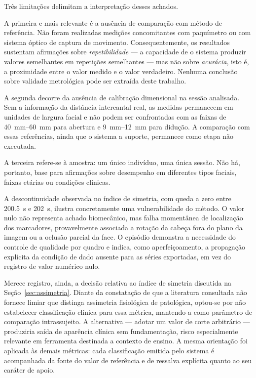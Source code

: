 \documentclass[
    article,
    11pt,
    oneside,
    a4paper,
    english,
    brazil
]{abntex2}
\begin{document}
Três limitações delimitam a interpretação desses achados.

A primeira e mais relevante é a ausência de comparação com método de
referência. Não foram realizadas medições concomitantes com paquímetro ou
com sistema óptico de captura de movimento. Consequentemente, os resultados
sustentam afirmações sobre \textit{repetibilidade} --- a capacidade de o
sistema produzir valores semelhantes em repetições semelhantes --- mas não
sobre \textit{acurácia}, isto é, a proximidade entre o valor medido e o
valor verdadeiro. Nenhuma conclusão sobre validade metrológica pode ser
extraída deste trabalho.

A segunda decorre da ausência de calibração dimensional na sessão
analisada. Sem a informação da distância intercantal real, as medidas
permanecem em unidades de largura facial e não podem ser confrontadas com as
faixas de \SIrange{40}{60}{\milli\metre} para abertura e
\SIrange{9}{12}{\milli\metre} para didução. A comparação com essas
referências, ainda que o sistema a suporte, permanece como etapa não
executada.

A terceira refere-se à amostra: um único indivíduo, uma única sessão. Não
há, portanto, base para afirmações sobre desempenho em diferentes tipos
faciais, faixas etárias ou condições clínicas.

A descontinuidade observada no índice de simetria, com queda a zero entre
\SI{200,5}{\second} e \SI{202}{\second}, ilustra concretamente uma
vulnerabilidade do método. O valor nulo não representa achado
biomecânico, mas falha momentânea de localização dos marcadores,
provavelmente associada a rotação da cabeça fora do plano da imagem ou a
oclusão parcial da face. O episódio demonstra a necessidade do controle de
qualidade por quadro e indica, como aperfeiçoamento, a propagação explícita
da condição de dado ausente para as séries exportadas, em vez do registro de
valor numérico nulo.

Merece registro, ainda, a decisão relativa ao índice de simetria discutida
na Seção~\ref{sec:assimetria}. Diante da constatação de que a literatura
consultada não fornece limiar que distinga assimetria fisiológica de
patológica, optou-se por não estabelecer classificação clínica para essa
métrica, mantendo-a como parâmetro de comparação intrassujeito. A alternativa
--- adotar um valor de corte arbitrário --- produziria saída de aparência
clínica sem fundamentação, risco especialmente relevante em ferramenta
destinada a contexto de ensino. A mesma orientação foi aplicada às demais
métricas: cada classificação emitida pelo sistema é acompanhada da fonte do
valor de referência e de ressalva explícita quanto ao seu caráter de apoio.
\end{document}

